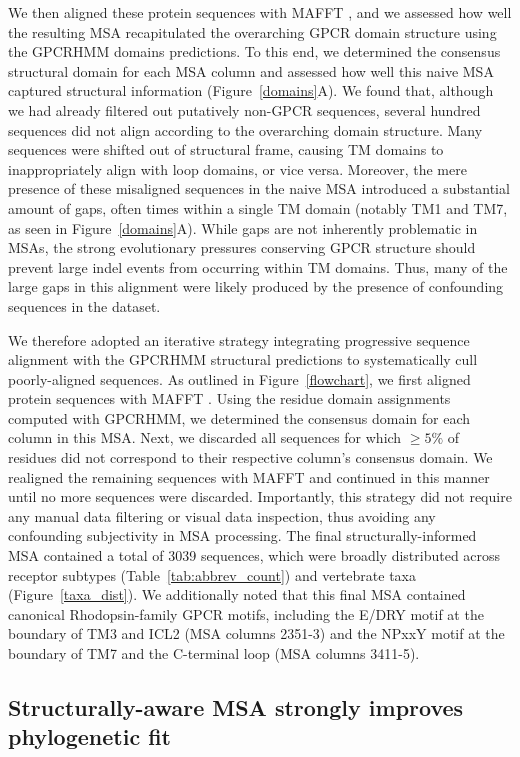 \documentclass[fleqn,10pt]{wlpeerj}
\begin{document}
We then aligned these protein sequences with MAFFT \citep{mafftv7}, and we assessed how well the resulting MSA recapitulated the overarching GPCR domain structure using the GPCRHMM domains predictions. To this end, we determined the consensus structural domain for each MSA column and assessed how well this naive MSA captured structural information (Figure~\ref{domains}A). We found that, although we had already filtered out putatively non-GPCR sequences, several hundred sequences did not align according to the overarching domain structure. Many sequences were shifted out of structural frame, causing TM domains to inappropriately align with loop domains, or vice versa. Moreover, the mere presence of these misaligned sequences in the naive MSA introduced a substantial amount of gaps, often times within a single TM domain (notably TM1 and TM7, as seen in Figure~\ref{domains}A). While gaps are not inherently problematic in MSAs, the strong evolutionary pressures conserving GPCR structure should prevent large indel events from occurring within TM domains. Thus, many of the large gaps in this alignment were likely produced by the presence of confounding sequences in the dataset.

We therefore adopted an iterative strategy integrating progressive sequence alignment with the GPCRHMM structural predictions to systematically cull poorly-aligned sequences. As outlined in Figure~\ref{flowchart}, we first aligned protein sequences with MAFFT \citep{mafftv7}. Using the residue domain assignments computed with GPCRHMM, we determined the consensus domain for each column in this MSA. Next, we discarded all sequences for which $\geq 5\%$ of residues did not correspond to their respective column's consensus domain. We realigned the remaining sequences with MAFFT and continued in this manner until no more sequences were discarded. Importantly, this strategy did not require any manual data filtering or visual data inspection, thus avoiding any confounding subjectivity in MSA processing. The final structurally-informed MSA contained a total of 3039 sequences, which were broadly distributed across receptor subtypes (Table~\ref{tab:abbrev_count}) and vertebrate taxa (Figure~\ref{taxa_dist}). We additionally noted that this final MSA contained canonical Rhodopsin-family GPCR motifs, including the E/DRY motif at the boundary of TM3 and ICL2 (MSA columns 2351-3) and the NPxxY motif at the boundary of TM7 and the C-terminal loop (MSA columns 3411-5).



\subsection*{Structurally-aware MSA strongly improves phylogenetic fit}
\end{document}
